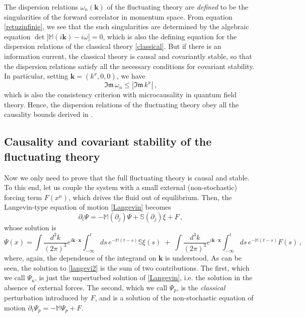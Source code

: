 \documentclass[a4paper, amsfonts, amssymb, amsmath, reprint, showkeys, nofootinbib, twoside,notitlepage,onecolumn]{revtex4-2}
\newcommand{\Ma}{{\mathbb{M}}}
\newcommand{\Sa}{{\mathbb{S}}}
\theoremstyle{definition}
\begin{document}
The dispersion relations $\omega_n(\textbf{k})$ of the fluctuating theory are \textit{defined} to be the singularities of the forward correlator in momentum space. From equation \eqref{retuzinfinie}, we see that the such singularities are determined by the algebraic equation $\det \big[ \Ma(i\textbf{k})-i\omega \big]=0$, which is also the defining equation for the dispersion relations of the classical theory \eqref{classical}. But if there is an information current, the classical theory is causal and covariantly stable, so that the dispersion relations satisfy all the necessary conditions for covariant stability. In particular, setting $\textbf{k}=(k^x,0,0)$, we have \cite{GavassinoBounds2023}
\begin{equation}
    \mathfrak{Im} \, \omega_n \leq |\mathfrak{Im} \, k^x| \, ,
\end{equation}
which is also the consistency criterion with microcausality in quantum field theory. Hence, the dispersion relations of the fluctuating theory obey all the causality bounds derived in \cite{HellerBounds2022}.

\subsection{Causality and covariant stability of the fluctuating theory}\label{macrY}

Now we only need to prove that the full fluctuating theory is causal and stable. To this end, let us couple the system with a small external (non-stochastic) forcing term $F(x^\mu)$, which drives the fluid out of equilibrium. Then, the Langevin-type equation of motion \eqref{Langevin} becomes
\begin{equation}\label{langevi2}
     \partial_t \Psi = -\Ma (\partial_j)\Psi +\Sa(\partial_j) \xi +F \, ,
\end{equation}
whose solution is
\begin{equation}\label{realization}
    \Psi(x)= \int \dfrac{d^3 k}{(2\pi)^3} e^{i\textbf{k}\cdot\textbf{x}} \! \! \! \int_{-\infty}^t \! \! \! \! ds \,  e^{-\Ma (t-s)} \Sa \xi(s) \; + \; \int \dfrac{d^3 k}{(2\pi)^3} e^{i\textbf{k} \cdot\textbf{x}}  \! \! \! \int_{-\infty}^t \! \! \! \! ds \,  e^{-\Ma (t-s)} F(s) \, ,
\end{equation}
where, again, the dependence of the integrand on $\textbf{k}$ is understood. As can be seen, the solution to \eqref{langevi2} is the sum of two contributions. The first, which we call $\Psi_u$, is just the unperturbed solution of \eqref{Langevin}, i.e. the solution in the absence of external forces. The second, which we call $\Psi_p$, is the \textit{classical} perturbation introduced by $F$, and is a solution of the non-stochastic equation of motion $\partial_t \Psi_p =-\Ma \Psi_p +F$.
\end{document}
